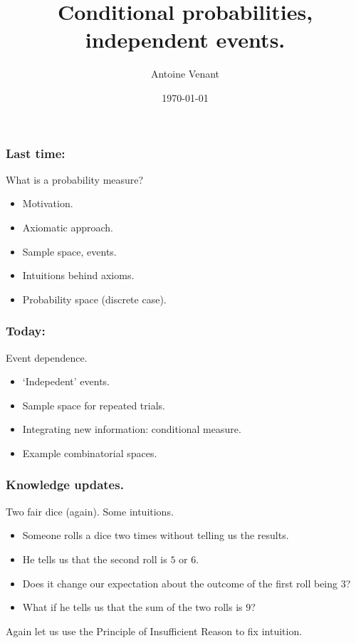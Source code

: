 \documentclass{beamer}
\begin{document}
\title{Conditional probabilities, independent events.} 
\author{Antoine Venant}
\date{\today}
\maketitle

\begin{frame}
  \frametitle{Last time:}
  \begin{block}{What is a probability measure?}
    \begin{itemize}
    \item Motivation.
    \item Axiomatic approach.
    \item Sample space, events.
    \item Intuitions behind axioms.
    \item Probability space (discrete case).
    \end{itemize}
  \end{block}
\end{frame}

\begin{frame}
  \frametitle{Today:}
  \begin{block}{Event dependence.}
    \begin{itemize}
    \item `Indepedent' events.
    \item Sample space for repeated trials.
    \item Integrating new information: conditional measure.
    \item Example combinatorial spaces.
    \end{itemize}
  \end{block}
\end{frame}

\begin{frame}
  \frametitle{Knowledge updates.}
  \begin{exampleblock}{Two fair dice (again).}
    Some intuitions.
    \begin{itemize}
    \item Someone rolls a dice two times without telling us the results.
    \item He tells us that the second roll is $5$ or $6$.
    \item Does it change our expectation about the outcome of the first roll being $3$?
    \item What if he tells us that the sum of the two rolls is $9$?
    \end{itemize}
  \end{exampleblock}
  Again let us use the Principle of Insufficient Reason to fix intuition.
 
\end{frame}
\end{document}
